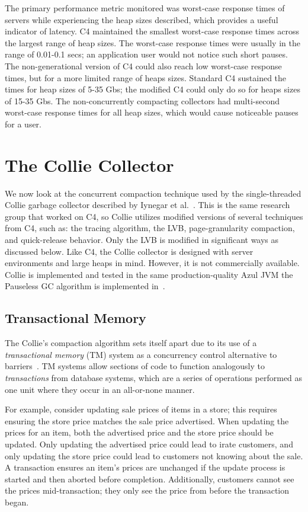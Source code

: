 \documentclass{sig-alternate}
\begin{document}
The primary performance metric monitored was worst-case response times
of servers while experiencing the heap sizes
described, which provides a useful indicator of latency.
C4 maintained the smallest 
worst-case response times across the largest range of heap sizes.
The worst-case response times were usually in the range of 0.01-0.1 secs;
an application user would not notice such short pauses. 
The non-generational version of C4 could also reach low worst-case response times,
but for a more limited range of heaps sizes. Standard
C4 sustained the times for heap sizes of 5-35 Gbs; the modified C4 could
only do so for heaps sizes of 15-35 Gbs. The non-concurrently compacting
collectors had multi-second worst-case response times for all heap sizes,
which would cause noticeable pauses for a user.


\section{The Collie Collector}
\label{sec:collie}

We now look at the concurrent compaction technique used by the single-threaded
Collie garbage collector described by Iynegar et al.~\cite{Iyengar:Collie}.
This is the same research group that worked on C4, so Collie utilizes modified 
versions of several techniques from C4, such as:
the tracing algorithm, the LVB, page-granularity compaction, and quick-release behavior.
Only the LVB is modified in significant ways as discussed below.
Like C4, the Collie
collector is designed with server environments and large heaps in mind.
However, it is not commercially available. 
Collie is implemented and tested in 
the same production-quality Azul JVM the Pauseless GC algorithm is implemented 
in~\cite{Click:Pauseless}. 


\subsection{Transactional Memory}
\label{sec:collieTM}

The Collie's compaction algorithm sets itself apart due to its use 
of a \emph{transactional memory} (TM) system as a concurrency control 
alternative to barriers~\cite{Iyengar:Collie}. TM systems allow
sections of code to function 
analogously to \emph{transactions} from database systems, 
which are a series of operations performed as one unit where 
they occur in an all-or-none manner.

For example, consider updating sale prices of items in a store; this requires
ensuring the store price matches the sale price advertised. 
When updating the prices for an item, both the
advertised price and the store price should be updated. Only updating the
advertised price could lead to irate customers, and only updating the
store price could lead to customers not knowing about the sale. A transaction
ensures an item's prices are unchanged if the update process 
is started and then aborted before completion. Additionally, customers cannot
see the prices mid-transaction; they only see the price from before the transaction began.
\end{document}
